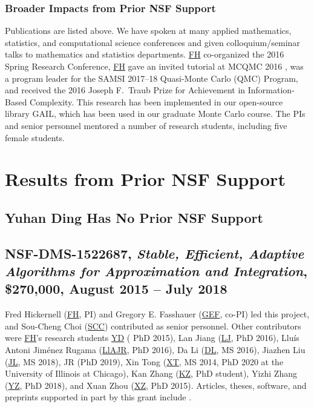 \documentclass[11pt]{NSFamsart}
\newcommand{\FH}{\hyperlink{FHlink}{FH}\xspace}
\newcommand{\SCTC}{\hyperlink{SCTClink}{SCC}\xspace}
\newcommand{\GEF}{\hyperlink{GEFlink}{GEF}\xspace}
\newcommand{\YD}{\hyperlink{YDlink}{YD}\xspace}
\newcommand{\LlAJR}{\hyperlink{LlAJRlink}{LlAJR}\xspace}
\newcommand{\LJ}{\hyperlink{LJlink}{LJ}\xspace}
\newcommand{\XT}{\hyperlink{XTlink}{XT}\xspace}
\newcommand{\KZ}{\hyperlink{KZlink}{KZ}\xspace}
\newcommand{\DL}{\hyperlink{DLlink}{DL}\xspace}
\newcommand{\XZ}{\hyperlink{XZlink}{XZ}\xspace}
\newcommand{\JL}{\hyperlink{JLlink}{JL}\xspace}
\newcommand{\YZ}{\hyperlink{YZlink}{YZ}\xspace}
\newcommand{\GAIL}{GAIL\xspace}
\begin{document}
\subsubsection{Broader Impacts from Prior NSF Support} \label{prevBIsect}
Publications are listed above.  We have spoken at many applied mathematics, statistics,
and computational science conferences and given colloquium/seminar talks to mathematics and
statistics departments.  \FH co-organized the
2016 Spring Research
Conference, \FH gave an invited tutorial
at MCQMC 2016
\cite{Hic17a}, was a program leader for the SAMSI 2017--18 Quasi-Monte Carlo (QMC) Program, and received the 2016 Joseph F.\ Traub Prize for Achievement in Information-Based Complexity.  This research has been implemented in our open-source library
\GAIL \cite{ChoEtal21a}, which  has been used in our graduate Monte Carlo course. The PIs and senior personnel mentored a number of
research students, including five female students.


\iffalse 
\section{Results from Prior NSF Support} \label{sec:prior_work}

\subsection{Yuhan Ding Has No Prior NSF Support}

\subsection{NSF-DMS-1522687, \emph{Stable, Efficient, Adaptive Algorithms for
			Approximation and Integration},
		\$270,000, August 2015 -- July 2018} \label{sec:PreviousFred}
Fred Hickernell (\FH, PI) and Gregory E. Fasshauer (\GEF, co-PI) led this project, and Sou-Cheng Choi (\SCTC) contributed as senior personnel.  Other contributors were \FH's research students {\YD} ( PhD 2015), \hypertarget{LJlink}{ Lan Jiang } (\LJ, PhD 2016),
\hypertarget{LlAJRlink}{Llu\'is Antoni Jim\'enez Rugama} (\LlAJR, PhD 2016), \hypertarget{DLlink}{Da Li} (\DL, MS 2016), \hypertarget{JLlink}{Jiazhen Liu} (\JL, MS 2018), JR (PhD 2019), \hypertarget{XTlink}{Xin Tong} (\XT, MS 2014, PhD 2020 at the University of Illinois at Chicago), \hypertarget{KZlink}{Kan Zhang} (\KZ, PhD student), \hypertarget{YZlink}{Yizhi Zhang} (\YZ, PhD 2018), and \hypertarget{XZlink}{Xuan Zhou} (\XZ, PhD 2015).  Articles, theses,
software, and preprints supported in
part by this
grant
include
\cite{ala_augmented_2017,
	ChoEtal17a,
	ChoEtal21a,
	Din15a,
	DinHic20a,
	GilEtal16a,
	Hic17a,
	HicJag18b,
	HicJim16a,
	HicEtal18a,
	HicEtal17a,
	HicKriWoz19a,
	RatHic19a,
	GilJim16b,
	JimHic16a,
	JohFasHic18a,
	Li16a,
	Liu17a,
	MarEtal18a,
	mccourt_stable_2017,
	MCCEtal19a,
	mishra_hybrid_2018,
	MisEtal19a,
	rashidinia_stable_2016,
	rashidinia_stable_2018,
	Zha18a,
	Zha17a,
	Zho15a,
	ZhoHic15a}.
\end{document}
